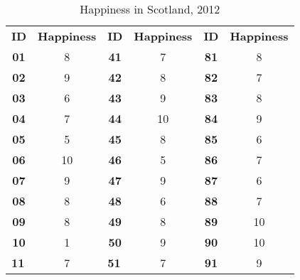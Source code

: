 \begin{table}[]
	\centering
	\caption{Happiness in Scotland, 2012}
	\begin{tabular}{cccccc}
		\textbf{ID}                     & \textbf{Happiness} & \textbf{ID}                     & \textbf{Happiness} & \textbf{ID}                   & \textbf{Happiness}            \\
		\textbf{01}                     & 8                  & \textbf{41}                     & 7                  & \textbf{81}                   & 8                             \\
		\textbf{02}                     & 9                  & \textbf{42}                     & 8                  & \textbf{82}                   & 7                             \\
		\textbf{03}                     & 6                  & \textbf{43}                     & 9                  & \textbf{83}                   & 8                             \\
		\textbf{04}                     & 7                  & \textbf{44}                     & 10                 & \textbf{84}                   & 9                             \\
		\textbf{05}                     & 5                  & \textbf{45}                     & 8                  & \textbf{85}                   & 6                             \\
		\textbf{06}                     & 10                 & \textbf{46}                     & 5                  & \textbf{86}                   & 7                             \\
		\textbf{07}                     & 9                  & \textbf{47}                     & 9                  & \textbf{87}                   & 6                             \\
		\textbf{08}                     & 8                  & \textbf{48}                     & 6                  & \textbf{88}                   & 7                             \\
		\textbf{09}                     & 8                  & \textbf{49}                     & 8                  & \textbf{89}                   & 10                            \\
		\textbf{10}                     & 1                  & \textbf{50}                     & 9                  & \textbf{90}                   & 10                            \\
		\multicolumn{1}{l}{\textbf{11}} & 7                  & \multicolumn{1}{l}{\textbf{51}} & 7                  & \textbf{91}                   & 9                             \\

\end{tabular}
\end{table}
